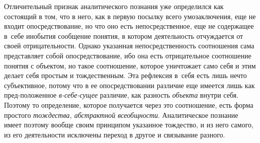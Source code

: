 Отличительный признак аналитического познания уже определился
как состоящий в том, что в него, как в первую посылку всего умозаключения,
еще не входит опосредствование, но что оно есть непосредственное, еще не
содержащее в~себе инобытия сообщение понятия, в котором деятельность
отчуждается от своей отрицательности. Однако указанная непосредственность
соотношения сама представляет собой опосредствование, ибо она есть
отрицательное соотношение понятия с объектом, но такое соотношение, которое
уничтожает само себя и этим делает себя простым и тождественным. Эта
рефлексия в~себя есть лишь нечто субъективное, потому что в ее
опосредствовании различие еще имеется лишь как пред-положенное
{\em в-себе-сущее}
различие, как разность
{\em объекта} внутри
себя. Поэтому то определение, которое получается через это соотношение,
есть форма простого {\em тождества,
абстрактной всеобщности}. Аналитическое познание имеет
поэтому вообще своим принципом указанное тождество, и из него самого, из
его деятельности исключены переход в другое и связывание разного.

